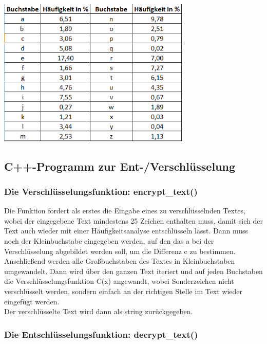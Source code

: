 \documentclass[ngerman,12pt]{article}
\begin{document}
\begin{center}
\includegraphics[width=260pt,height=200pt]{buchstaben-haeufigkeit-deutsches-alphabet.jpg}
\end{center}

\newpage

\subsection*{C++-Programm zur Ent-/Verschlüsselung}

\subsubsection*{Die Verschlüsselungsfunktion: encrypt\_text()}

Die Funktion fordert als erstes die Eingabe eines zu verschlüsselnden Textes, wobei der eingegebene Text mindestens 25 Zeichen enthalten muss, damit sich der Text auch wieder mit einer Häufigkeitsanalyse entschlüsseln lässt. Dann muss noch der Kleinbuchstabe eingegeben werden, auf den das a bei der Verschlüsselung abgebildet werden soll, um die Differenz c zu bestimmen. \\
Anschließend werden alle Großbuchstaben des Textes in Kleinbuchstaben umgewandelt. Dann wird über den ganzen Text iteriert und auf jeden Buchstaben die Verschlüsselungsfunktion C(x) angewandt, wobei Sonderzeichen nicht verschlüsselt werden, sondern einfach an der richtigen Stelle im Text wieder eingefügt werden. \\
Der verschlüsselte Text wird dann als string zurückgegeben.


\subsubsection*{Die Entschlüsselungsfunktion: decrypt\_text()}
\end{document}
